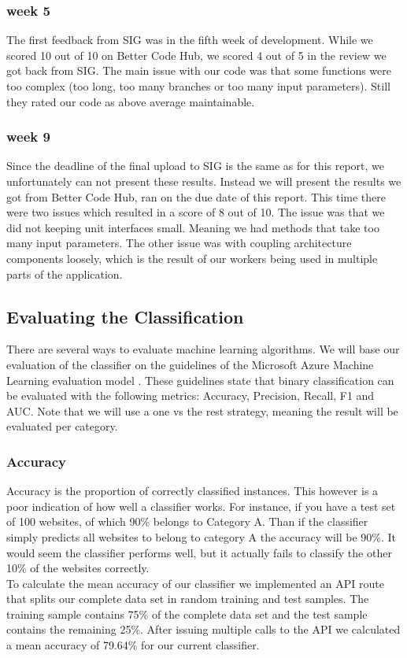 \subsubsection{week 5}
The first feedback from SIG was in the fifth week of development. While we scored 10 out of 10 on Better Code Hub, we scored 4 out of 5 in the review we got back from SIG. The main issue with our code was that some functions were too complex (too long, too many branches or too many input parameters). Still they rated our code as above average maintainable.

\subsubsection{week 9}
Since the deadline of the final upload to SIG is the same as for this report, we unfortunately can not present these results. Instead we will present the results we got from Better Code Hub, ran on the due date of this report. This time there were two issues which resulted in a score of 8 out of 10. The issue was that we did not keeping unit interfaces small. Meaning we had methods that take too many input parameters. The other issue was with coupling architecture components loosely, which is the result of our workers being used in multiple parts of the application.

\subsection{Evaluating the Classification}
There are several ways to evaluate machine learning algorithms. We will base our evaluation of the classifier on the guidelines of the Microsoft Azure Machine Learning evaluation model \cite{EvualteML}. These guidelines state that binary classification can be evaluated with the following metrics: Accuracy, Precision, Recall, F1 and AUC. Note that we will use a one vs the rest strategy, meaning the result will be evaluated per category.

\subsubsection{Accuracy}\label{sec:mean-accuracy}
Accuracy is the proportion of correctly classified instances. This however is a poor indication of how well a classifier works. For instance, if you have a test set of 100 websites, of which 90\% belongs to Category A. Than if the classifier simply predicts all websites to belong to category A the accuracy will be 90\%. It would seem the classifier performs well, but it actually fails to classify the other 10\% of the websites correctly.\\ 
To calculate the mean accuracy of our classifier we implemented an API route that splits our complete data set in random training and test samples. The training sample contains 75\% of the complete data set and the test sample contains the remaining 25\%. After issuing multiple calls to the API we calculated a mean accuracy of 79.64\% for our current classifier. 

